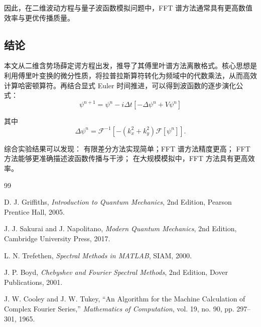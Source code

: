 \documentclass[UTF8,a4paper,12pt]{ctexart}
\begin{document}
因此，在二维波动方程与量子波函数模拟问题中，FFT 谱方法通常具有更高数值效率与更优传播质量。


\subsection{结论}


本文从二维含势场薛定谔方程出发，推导了其傅里叶谱方法离散格式。核心思想是利用傅里叶变换的微分性质，将拉普拉斯算符转化为频域中的代数乘法，从而高效计算哈密顿算符。再结合显式 Euler 时间推进，可以得到波函数的逐步演化公式：
\[
\psi^{n+1}
=
\psi^n
-i\Delta t
\left[
-\Delta\psi^n+V\psi^n
\right]
\]

其中
\[
\Delta\psi^n
=
\mathcal{F}^{-1}
\left[
-(k_x^2+k_y^2)\mathcal{F}[\psi^n]
\right].
\]

综合实验结果可以发现：
有限差分方法实现简单；FFT 谱方法精度更高；
FFT 方法能够更准确描述波函数传播与干涉；
在大规模模拟中，FFT 方法具有更高效率。

\begin{thebibliography}{99}

D. J. Griffiths,
\textit{Introduction to Quantum Mechanics},
2nd Edition,
Pearson Prentice Hall, 2005.

J. J. Sakurai and J. Napolitano,
\textit{Modern Quantum Mechanics},
2nd Edition,
Cambridge University Press, 2017.

L. N. Trefethen,
\textit{Spectral Methods in MATLAB},
SIAM, 2000.

J. P. Boyd,
\textit{Chebyshev and Fourier Spectral Methods},
2nd Edition,
Dover Publications, 2001.

J. W. Cooley and J. W. Tukey,
``An Algorithm for the Machine Calculation of Complex Fourier Series,''
\textit{Mathematics of Computation},
vol. 19, no. 90, pp. 297--301, 1965.

\end{thebibliography}
\end{document}
